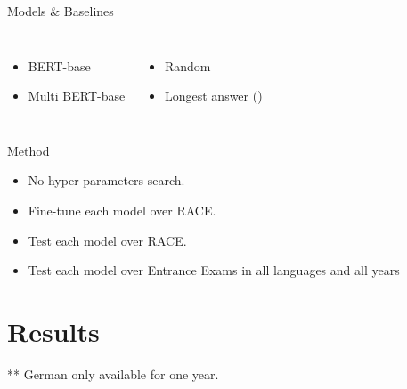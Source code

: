 \documentclass[]{beamer}
\def\mAlertSpace{\vspace{0.5em}}
\begin{document}
  \begin{frame}{\secname}
    \begin{alertblock}{Models \& Baselines}
      \mAlertSpace
      \begin{columns}[T, onlytextwidth]
          \mAlertSpace
          \begin{itemize}
            \item BERT-base
            \item Multi BERT-base
          \end{itemize}
          \mAlertSpace
          \begin{itemize}
            \item Random
            \item Longest answer (\cite{Rogers2020quail})
          \end{itemize}
      \end{columns}
    \end{alertblock}
    \mAlertSpace
    \begin{alertblock}{Method}
      \begin{itemize}
        \item No hyper-parameters search.
        \item Fine-tune each model over RACE.
        \item Test each model over RACE.
        \item Test each model over Entrance Exams in all languages and all years
      \end{itemize}
    \end{alertblock}
  \end{frame}

\section{Results}
  \begin{frame}{\secname}
    
    \mAlertSpace
    \small{** German only available for one year.}
  \end{frame}

\end{document}
